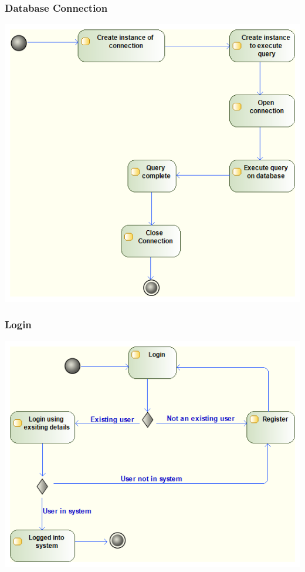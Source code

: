 \documentclass[11pt]{article}
\begin{document}
\subsubsection{Database Connection}
\begin{center} 
	\includegraphics[width=\textwidth]{../Images/Database_Connection_Activity-Diagram.png}\\[0.5cm]
\end{center}

\newpage
\subsubsection{Login}
\begin{center} 
	\includegraphics[width=\textwidth]{../Images/Login_Activity_Diagram.png}\\[0.5cm]
\end{center}
\end{document}
